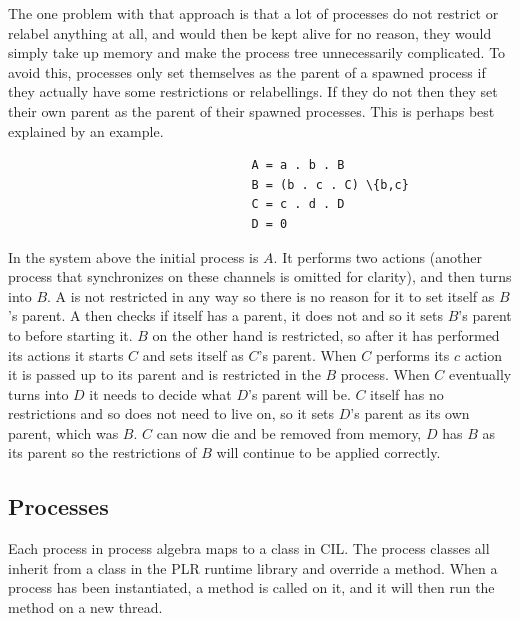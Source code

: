 	The one problem with that approach is that a lot of processes do not 
	restrict or relabel anything at all, and would then be kept alive for no 
	reason, they would simply take up memory and make the process tree 
	unnecessarily complicated. To avoid this, processes only set themselves as 
	the parent of a spawned process if they actually have some restrictions or 
	relabellings. If they do not then they set their own parent as the parent of 
	their spawned processes. This is perhaps best explained by an example.
	
	\begin{verbatim}
			                      A = a . b . B
			                      B = (b . c . C) \{b,c}
			                      C = c . d . D
			                      D = 0
	\end{verbatim}
	
	In the system above the initial process is $A$. It performs two actions 
	(another process that synchronizes on these channels is omitted for 
	clarity), and then turns into $B$. A is not restricted in any way so there 
	is no reason for it to set itself as $B$'s parent. A then checks if itself 
	has a parent, it does not and so it sets $B$'s parent to  before 
	starting it. $B$ on the other hand is restricted, so after it has performed 
	its actions it starts $C$ and sets itself as $C$'s parent. When $C$ performs 
	its $c$ action it is passed up to its parent and is restricted in the $B$ 
	process. When $C$ eventually turns into $D$ it needs to decide what $D$'s 
	parent will 
	be. $C$ itself has no restrictions and so does not need to live on, so it 
	sets $D$'s parent as its own parent, which was $B$. $C$ can now die and be 
	removed from memory, $D$ has $B$ as its parent so the restrictions of $B$ 
	will continue to be applied correctly.
	
	\subsection{Processes}
	Each process in process algebra maps to a class in CIL. The process classes 
	all inherit from a  class in the PLR runtime library and 
	override a  method. When a process has been instantiated, a 
	 method is called on it, and it will then run the 
	 method on a new thread.

